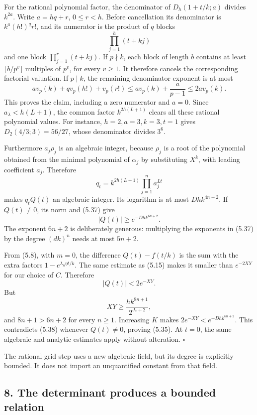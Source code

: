 \documentclass[
  11pt,
  a4paper,
]{article}
\begin{document}
For the rational polynomial factor, the denominator of \(D_h(1+t/k;a)\)
divides \(k^{2a}\). Write \(a=hq+r\), \(0\le r<h\). Before cancellation
its denominator is \(k^a(h!)^q r!\), and its numerator is the product of
\(q\) blocks \[
\prod_{j=1}^h(t+kj)
\] and one block \(\prod_{j=1}^r(t+kj)\). If \(p\nmid k\), each block of
length \(b\) contains at least \(\lfloor b/p^v\rfloor\) multiples of
\(p^v\), for every \(v\ge1\). It therefore cancels the corresponding
factorial valuation. If \(p\mid k\), the remaining denominator exponent
is at most \[
av_p(k)+qv_p(h!)+v_p(r!)
\le av_p(k)+\frac a{p-1}\le2av_p(k).
\] This proves the claim, including a zero numerator and \(a=0\). Since
\(a_\lambda<h(L+1)\), the common factor \(k^{2h(L+1)}\) clears all these
rational polynomial values. For instance, \(h=2,a=3,k=3,t=1\) gives
\(D_2(4/3;3)=56/27\), whose denominator divides \(3^6\).

Furthermore \(a_j\rho_j\) is an algebraic integer, because \(\rho_j\) is
a root of the polynomial obtained from the minimal polynomial of
\(\alpha_j\) by substituting \(X^k\), with leading coefficient \(a_j\).
Therefore \[
q_t=k^{2h(L+1)}\prod_{j=1}^n a_j^{Lt}
\] makes \(q_tQ(t)\) an algebraic integer. Its logarithm is at most
\(Dhk^{4n+2}\). If \(Q(t)\ne0\), its norm and (5.37) give \[
|Q(t)|\ge e^{-Dhk^{6n+2}}. \tag{5.38}
\] The exponent \(6n+2\) is deliberately generous: multiplying the
exponents in (5.37) by the degree \((dk)^n\) needs at most \(5n+2\).

From (5.8), with \(m=0\), the difference \(Q(t)-f(t/k)\) is the sum with
the extra factors \(1-e^{\lambda_n\eta t/k}\). The same estimate as
(5.15) makes it smaller than \(e^{-2XY}\) for our choice of \(C\).
Therefore \[
|Q(t)|<2e^{-XY}.
\] But \[
XY\ge \frac{hk^{8n+1}}{2^{J_*+2}},
\] and \(8n+1>6n+2\) for every \(n\ge1\). Increasing \(K\) makes
\(2e^{-XY}<e^{-Dhk^{6n+2}}\). This contradicts (5.38) whenever
\(Q(t)\ne0\), proving (5.35). At \(t=0\), the same algebraic and
analytic estimates apply without alteration. \(\square\)

The rational grid step uses a new algebraic field, but its degree is
explicitly bounded. It does not import an unquantified constant from
that field.

\subsection{8. The determinant produces a bounded
relation}\label{the-determinant-produces-a-bounded-relation}
\end{document}
